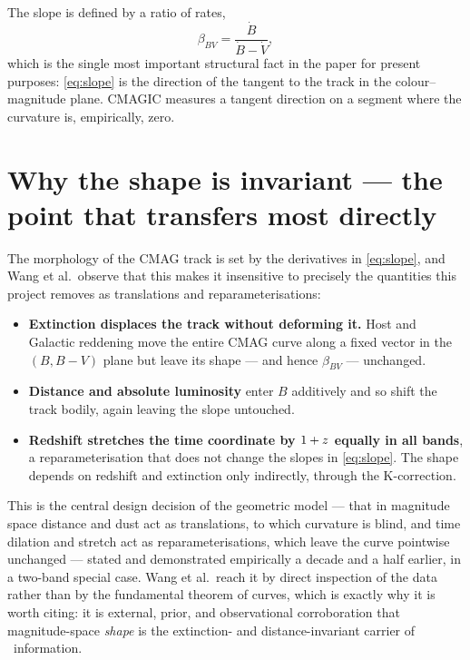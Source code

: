 \documentclass[11pt]{article}
\begin{document}
The slope is defined by a ratio of rates,
\begin{equation}
  \beta_{BV} = \frac{\dot{B}}{\dot{B} - \dot{V}},
  \label{eq:slope}
\end{equation}
which is the single most important structural fact in the paper for present
purposes: \eqref{eq:slope} is the direction of the tangent to the track in the
colour--magnitude plane. CMAGIC measures a tangent direction on a segment where the
curvature is, empirically, zero.

\section{Why the shape is invariant --- the point that transfers most directly}

The morphology of the CMAG track is set by the derivatives in \eqref{eq:slope}, and
Wang et al.\ observe that this makes it insensitive to precisely the quantities this
project removes as translations and reparameterisations:

\begin{itemize}
  \item \textbf{Extinction displaces the track without deforming it.} Host and
        Galactic reddening move the entire CMAG curve along a fixed vector in the
        $(B, B-V)$ plane but leave its shape --- and hence $\beta_{BV}$ --- unchanged.
  \item \textbf{Distance and absolute luminosity} enter $B$ additively and so shift
        the track bodily, again leaving the slope untouched.
  \item \textbf{Redshift stretches the time coordinate by $1+z$ equally in all
        bands}, a reparameterisation that does not change the slopes in
        \eqref{eq:slope}. The shape depends on redshift and extinction only
        indirectly, through the K-correction.
\end{itemize}

This is the central design decision of the geometric model
--- that in magnitude space distance and dust act as translations, to which
curvature is blind, and time dilation and stretch act as reparameterisations, which
leave the curve pointwise unchanged --- stated and demonstrated empirically a decade
and a half earlier, in a two-band special case. Wang et al.\ reach it by direct
inspection of the data rather than by the fundamental theorem of curves, which is
exactly why it is worth citing: it is external, prior, and observational
corroboration that magnitude-space \emph{shape} is the extinction- and
distance-invariant carrier of \snia\ information.
\end{document}
